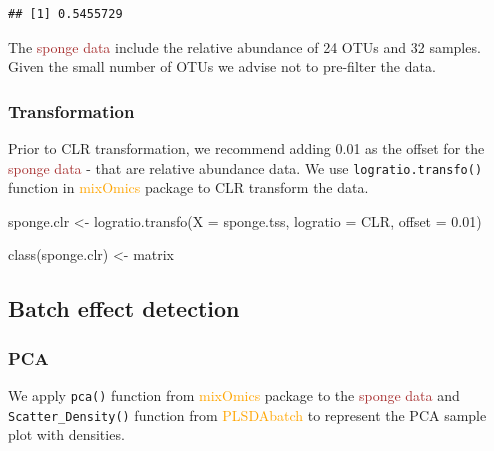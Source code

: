 \documentclass[
]{book}
\newenvironment{Shaded}{\begin{snugshade}}{\end{snugshade}}
\newcommand{\AttributeTok}[1]{\textcolor[rgb]{0.77,0.63,0.00}{#1}}
\newcommand{\FloatTok}[1]{\textcolor[rgb]{0.00,0.00,0.81}{#1}}
\newcommand{\FunctionTok}[1]{\textcolor[rgb]{0.00,0.00,0.00}{#1}}
\newcommand{\NormalTok}[1]{#1}
\newcommand{\OtherTok}[1]{\textcolor[rgb]{0.56,0.35,0.01}{#1}}
\newcommand{\StringTok}[1]{\textcolor[rgb]{0.31,0.60,0.02}{#1}}
\begin{document}
\begin{verbatim}
## [1] 0.5455729
\end{verbatim}

The \textcolor{brown}{sponge data} include the relative abundance of 24 OTUs and 32 samples. Given the small number of OTUs we advise not to pre-filter the data.

\hypertarget{transformation-1}{%
\subsubsection{Transformation}\label{transformation-1}}

Prior to CLR transformation, we recommend adding 0.01 as the offset for the \textcolor{brown}{sponge data} - that are relative abundance data. We use \texttt{logratio.transfo()} function in \textcolor{orange}{mixOmics} package to CLR transform the data.

\begin{Shaded}
\begin{Highlighting}[]
\NormalTok{sponge.clr }\OtherTok{\textless{}{-}} \FunctionTok{logratio.transfo}\NormalTok{(}\AttributeTok{X =}\NormalTok{ sponge.tss, }\AttributeTok{logratio =} \StringTok{\textquotesingle{}CLR\textquotesingle{}}\NormalTok{, }\AttributeTok{offset =} \FloatTok{0.01}\NormalTok{)}

\FunctionTok{class}\NormalTok{(sponge.clr) }\OtherTok{\textless{}{-}} \StringTok{\textquotesingle{}matrix\textquotesingle{}}
\end{Highlighting}
\end{Shaded}

\hypertarget{batch-effect-detection-1}{%
\subsection{Batch effect detection}\label{batch-effect-detection-1}}

\hypertarget{pca-1}{%
\subsubsection{PCA}\label{pca-1}}

We apply \texttt{pca()} function from \textcolor{orange}{mixOmics} package to the \textcolor{brown}{sponge data} and \texttt{Scatter\_Density()} function from \textcolor{orange}{PLSDAbatch} to represent the PCA sample plot with densities.
\end{document}
